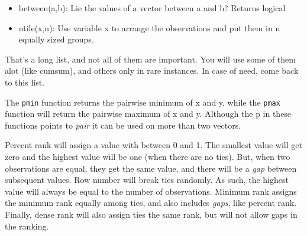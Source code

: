\documentclass[]{tufte-book}
\newenvironment{Shaded}{}{}
\newcommand{\DataTypeTok}[1]{\textcolor[rgb]{0.56,0.13,0.00}{#1}}
\newcommand{\DecValTok}[1]{\textcolor[rgb]{0.25,0.63,0.44}{#1}}
\newcommand{\KeywordTok}[1]{\textcolor[rgb]{0.00,0.44,0.13}{\textbf{#1}}}
\newcommand{\NormalTok}[1]{#1}
\newcommand{\OperatorTok}[1]{\textcolor[rgb]{0.40,0.40,0.40}{#1}}
\newcommand{\StringTok}[1]{\textcolor[rgb]{0.25,0.44,0.63}{#1}}
\providecommand{\tightlist}{%
  \setlength{\itemsep}{0pt}\setlength{\parskip}{0pt}}
\begin{document}
\begin{itemize}
\tightlist
\item
  between(a,b): Lie the values of a vector between a and b? Returns logical
\item
  ntile(x,n): Use variable x to arrange the observations and put them in n equally sized groups.
\end{itemize}

That's a long list, and not all of them are important. You will use some of them alot (like cumsum), and others only in rare instances. In case of need, come back to this list.

The \texttt{pmin} function returns the pairwise minimum of x and y, while the \texttt{pmax} function will return the pairwise maximum of x and y. Although the p in these functions points to \emph{pair} it can be used on more than two vectors.

Percent rank will assign a value with between 0 and 1. The smallest value will get zero and the highest value will be one (when there are no ties). But, when two observations are equal, they get the same value, and there will be a \emph{gap} between subsequent values. Row number will break ties randomly. As such, the highest value will always be equal to the number of observations. Minimum rank assigns the minimum rank equally among ties, and also includes \emph{gaps}, like percent rank. Finally, dense rank will also assign ties the same rank, but will not allow gaps in the ranking.

\begin{Shaded}
\end{Shaded}
\end{document}
